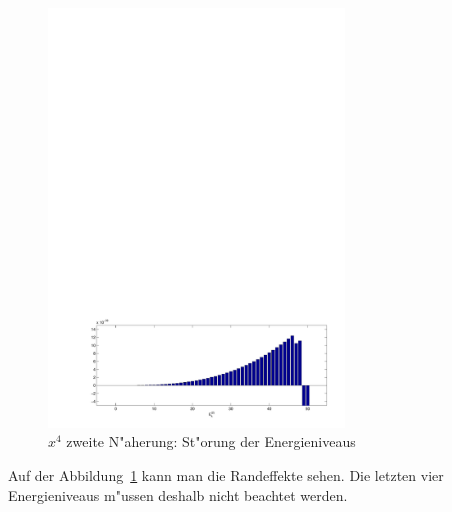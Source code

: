 \begin{refsection}
\begin{figure}	%
\centering
\includegraphics[width=0.7\textwidth]{anharmonisch/images/x4/EK2.pdf}
\caption{$x^4$ zweite N"aherung: St"orung der Energieniveaus  
\label{skript:x4_EK2}}
\end{figure}

Auf der Abbildung~\ref{skript:x4_EK2} kann man die Randeffekte sehen.
Die letzten vier Energieniveaus m"ussen deshalb nicht beachtet werden.


\end{refsection}
